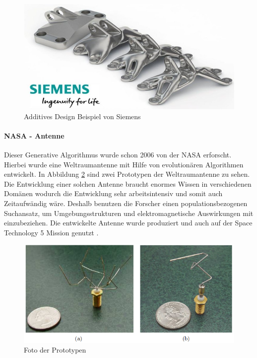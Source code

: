 \begin{figure}[h]
  \centering  
  \includegraphics[scale=0.4]{img/Additive.png}
  \caption{Additives Design Beispiel von Siemens \cite{siemens}}
  \label{fig:additives}
\end{figure}

\paragraph{NASA - Antenne}
Dieser Generative Algorithmus wurde schon 2006 von der NASA erforscht. Hierbei wurde eine Weltraumantenne mit Hilfe von evolutionären Algorithmen entwickelt. In Abbildung \ref{fig:nasa} sind zwei Prototypen der Weltraumantenne zu sehen. Die Entwicklung einer solchen Antenne braucht enormes Wissen in verschiedenen Domänen wodurch die Entwicklung sehr arbeitsintensiv und somit auch Zeitaufwändig wäre. Deshalb benutzen die Forscher einen populationsbezogenen Suchansatz, um Umgebungsstrukturen und elektromagnetische Auswirkungen mit einzubeziehen. Die entwickelte Antenne wurde produziert und auch auf der Space Technology 5 Mission genutzt \cite{AutomatedAntenna}.

\begin{figure}[h]
  \centering  
  \includegraphics[scale=0.5]{img/nasa-antenne.png}
  \caption{Foto der Prototypen \cite{AutomatedAntenna}}
  \label{fig:nasa}
\end{figure}

